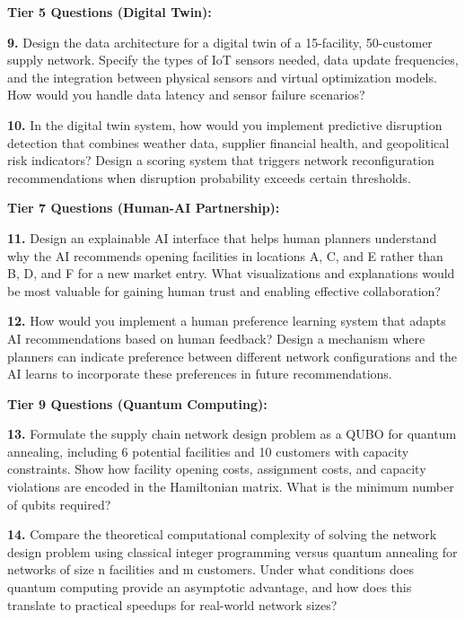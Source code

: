 \documentclass{article}
\begin{document}
\textbf{Tier 5 Questions (Digital Twin):}

\textbf{9.} Design the data architecture for a digital twin of a 15-facility, 50-customer supply network. Specify the types of IoT sensors needed, data update frequencies, and the integration between physical sensors and virtual optimization models. How would you handle data latency and sensor failure scenarios?

\textbf{10.} In the digital twin system, how would you implement predictive disruption detection that combines weather data, supplier financial health, and geopolitical risk indicators? Design a scoring system that triggers network reconfiguration recommendations when disruption probability exceeds certain thresholds.

\textbf{Tier 7 Questions (Human-AI Partnership):}

\textbf{11.} Design an explainable AI interface that helps human planners understand why the AI recommends opening facilities in locations A, C, and E rather than B, D, and F for a new market entry. What visualizations and explanations would be most valuable for gaining human trust and enabling effective collaboration?

\textbf{12.} How would you implement a human preference learning system that adapts AI recommendations based on human feedback? Design a mechanism where planners can indicate preference between different network configurations and the AI learns to incorporate these preferences in future recommendations.

\textbf{Tier 9 Questions (Quantum Computing):}

\textbf{13.} Formulate the supply chain network design problem as a QUBO for quantum annealing, including 6 potential facilities and 10 customers with capacity constraints. Show how facility opening costs, assignment costs, and capacity violations are encoded in the Hamiltonian matrix. What is the minimum number of qubits required?

\textbf{14.} Compare the theoretical computational complexity of solving the network design problem using classical integer programming versus quantum annealing for networks of size n facilities and m customers. Under what conditions does quantum computing provide an asymptotic advantage, and how does this translate to practical speedups for real-world network sizes?
\end{document}
